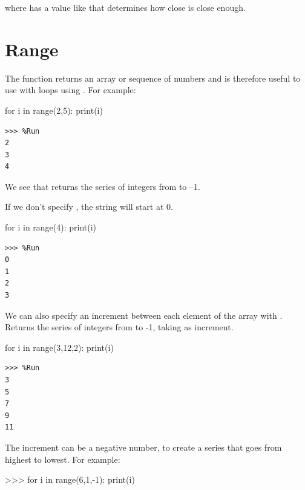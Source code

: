 %
where  has a value like  that determines how close is close enough.


\section{Range}\label{depuraciuxf3n}

The  function returns an array or sequence of numbers and is therefore useful to use with  loops using . For example:

\begin{python}[frame=single]
for i in range(2,5):
    print(i)
\end{python}

\begin{Verbatim}[frame=single]    
>>> %Run
2
3
4
\end{Verbatim}

We see that  returns the series of integers from  to –1.

If we don't specify , the string will start at 0.

\begin{python}[frame=single]
for i in range(4):
    print(i)
\end{python}

\begin{Verbatim}[frame=single]
>>> %Run    
0
1
2
3
\end{Verbatim}

We can also specify an increment between each element of the array with . Returns the series of integers from  to -1, taking  as increment.

\begin{python}[frame=single]
for i in range(3,12,2):
    print(i)
\end{python}   

\begin{Verbatim}[frame=single]
>>> %Run
3
5
7
9
11
\end{Verbatim}

The increment can be a negative number, to create a series that goes from highest to lowest. For example:

\begin{python}[frame=single]
>>> for i in range(6,1,-1):
    print(i)
\end{python}   

